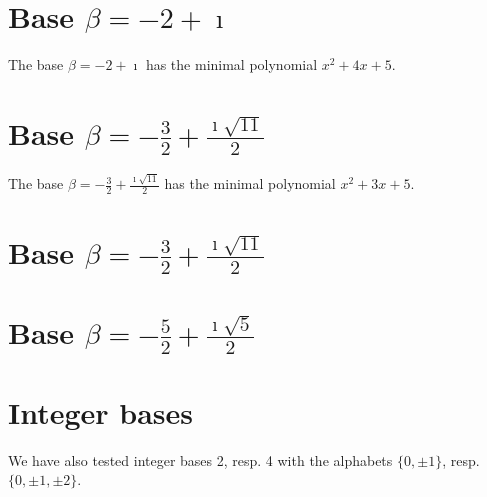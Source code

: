 

 

\section{Base $\beta = -2 + \imath$}
The base  $\beta = -2 + \imath$ has the minimal polynomial $x^2+4x +5$.

% 
\section{Base $\beta = -\frac{3}{2} + \frac{\imath \sqrt{11}}{2}$}
The base $\beta = -\frac{3}{2} + \frac{\imath \sqrt{11}}{2}$ has the minimal polynomial  $x^2+3x +5$.


\section{Base $\beta = -\frac{3}{2} + \frac{\imath \sqrt{11}}{2}$}


\section{Base $\beta = -\frac{5}{2} + \frac{\imath \sqrt{5}}{2}$}


\section{Integer bases}
We have also tested integer bases 2, resp. 4 with the alphabets $\{0,\pm 1\}$, resp. $\{0,\pm 1, \pm 2\}$.

